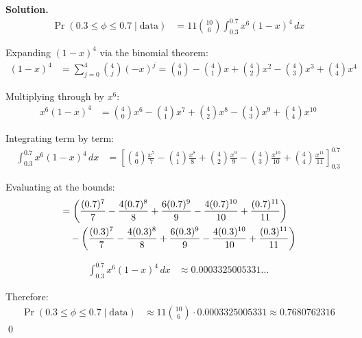 \documentclass[11pt]{article}
\newenvironment{solution}{\par\noindent\textbf{Solution.}\ }{\par\vspace{6pt}}
\begin{document}
\begin{enumerate}[label=(\alph*)]
\begin{solution}
        \begin{align}
            \Pr(0.3 \le \phi \le 0.7 \mid \text{data}) &= 11\binom{10}{6}\int_{0.3}^{0.7} x^6(1-x)^4\,dx
        \end{align}

        Expanding $(1-x)^4$ via the binomial theorem:
        \begin{align}
            (1-x)^4 &= \sum_{j=0}^{4} \binom{4}{j}(-x)^j = \binom{4}{0} - \binom{4}{1}x + \binom{4}{2}x^2 - \binom{4}{3}x^3 + \binom{4}{4}x^4
        \end{align}

        Multiplying through by $x^6$:
        \begin{align}
            x^6(1-x)^4 &= \binom{4}{0}x^6 - \binom{4}{1}x^7 + \binom{4}{2}x^8 - \binom{4}{3}x^9 + \binom{4}{4}x^{10}
        \end{align}

        Integrating term by term:
        \begin{align}
            \int_{0.3}^{0.7} x^6(1-x)^4\,dx
            &= \left[\binom{4}{0}\frac{x^7}{7} - \binom{4}{1}\frac{x^8}{8} + \binom{4}{2}\frac{x^9}{9} - \binom{4}{3}\frac{x^{10}}{10} + \binom{4}{4}\frac{x^{11}}{11}\right]_{0.3}^{0.7}
        \end{align}

        Evaluating at the bounds:
        \begin{align}
            &= \left(\frac{(0.7)^7}{7} - \frac{4(0.7)^8}{8} + \frac{6(0.7)^9}{9} - \frac{4(0.7)^{10}}{10} + \frac{(0.7)^{11}}{11}\right) \notag\\
            &\quad - \left(\frac{(0.3)^7}{7} - \frac{4(0.3)^8}{8} + \frac{6(0.3)^9}{9} - \frac{4(0.3)^{10}}{10} + \frac{(0.3)^{11}}{11}\right)
        \end{align}

        \begin{align}
            \int_{0.3}^{0.7} x^6(1-x)^4\,dx &\approx 0.0003325005331\dots
        \end{align}

        Therefore:
        \begin{align}
            \Pr(0.3 \le \phi \le 0.7 \mid \text{data}) &\approx 11\binom{10}{6}\cdot0.0003325005331 \approx 0.7680762316
        \end{align}
        \qed

    \end{solution}

    \end{enumerate}
\end{document}
